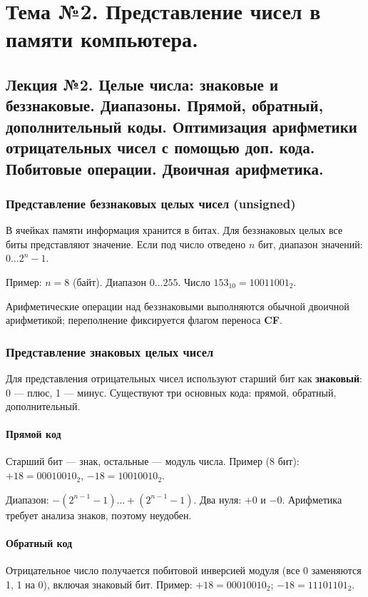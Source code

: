 \documentclass[a4paper,14pt]{report}
\begin{document}
\chapter{Тема №2. Представление чисел в памяти компьютера.}
\section{Лекция №2. Целые числа: знаковые и беззнаковые. Диапазоны. Прямой, обратный, дополнительный коды. Оптимизация арифметики отрицательных чисел с помощью доп. кода. Побитовые операции. Двоичная арифметика.}

\subsection{Представление беззнаковых целых чисел (unsigned)}
В ячейках памяти информация хранится в битах. Для беззнаковых целых все биты представляют значение. Если под число отведено $n$ бит, диапазон значений: $0 \dots 2^n-1$.

Пример: $n=8$ (байт). Диапазон $0\dots255$. Число $153_{10} = 10011001_2$.

Арифметические операции над беззнаковыми выполняются обычной двоичной арифметикой; переполнение фиксируется флагом переноса \textbf{CF}.

\subsection{Представление знаковых целых чисел}
Для представления отрицательных чисел используют старший бит как \textbf{знаковый}: 0 — плюс, 1 — минус. Существуют три основных кода: прямой, обратный, дополнительный.

\subsubsection{Прямой код}
Старший бит — знак, остальные — модуль числа.
Пример (8 бит): $+18 = 00010010_2$, $-18 = 10010010_2$.

Диапазон: $-(2^{n-1}-1) \dots +(2^{n-1}-1)$. Два нуля: $+0$ и $-0$. Арифметика требует анализа знаков, поэтому неудобен.

\subsubsection{Обратный код}
Отрицательное число получается побитовой инверсией модуля (все 0 заменяются 1, 1 на 0), включая знаковый бит.
Пример: $+18 = 00010010_2$; $-18 = 11101101_2$.
\end{document}
